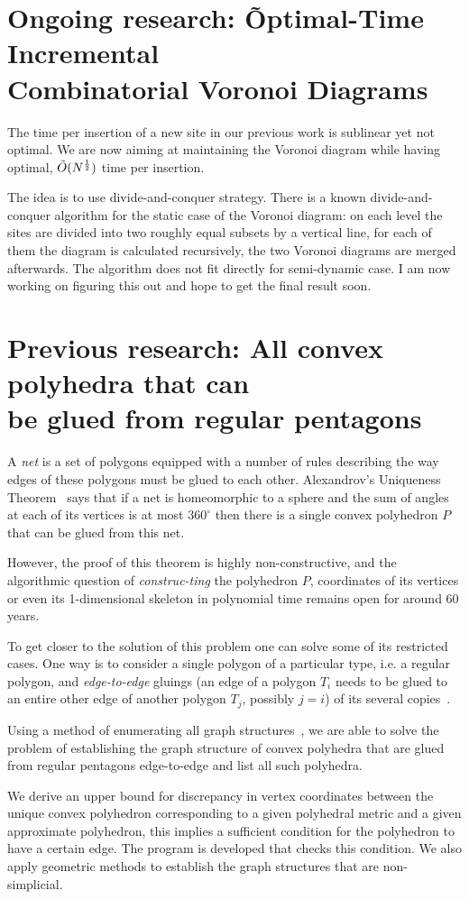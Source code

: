 \documentclass[a4paper,11pt]{article}
\def\vsection#1{\vspace{-4.5mm}\section{#1}\vspace{-3.5mm}}
\theoremstyle{definition}
\begin{document}
\vsection{Ongoing research: \~Optimal-Time Incremental \\
	Combinatorial Voronoi Diagrams}

The time per insertion of a new site in our previous work is sublinear yet not optimal. We are now aiming at maintaining the Voronoi diagram while having optimal, $\tilde O(N^{\frac12})$ time per insertion.

The idea is to use divide-and-conquer strategy. There is a known divide-and-conquer algorithm for the static case of the Voronoi diagram: on each level the sites are divided into two roughly equal subsets by a vertical line, for each of them the diagram is calculated recursively, the two Voronoi diagrams are merged afterwards. The algorithm does not fit directly for semi-dynamic case. I am now working on figuring this out and hope to get the final result soon.

\vsection{Previous research: All convex polyhedra that can\\
	be glued from regular pentagons}

	A \emph{net} is a set of polygons equipped with a number of rules describing the way edges of these polygons must be glued to each other. Alexandrov's Uniqueness Theorem~\cite{alex} says that if a net is homeomorphic to a sphere and the sum of angles at each of its vertices is at most $360^\circ$ then there is a single convex polyhedron $P$ that can be glued from this net.

However, the proof of this theorem is highly non-constructive, and the algorithmic question of {\it construc-\linebreak ting} the polyhedron $P$, coordinates of its vertices or even its 1-dimensional skeleton in polynomial time remains open for around 60 years.

To get closer to the solution of this problem one can solve some of its restricted cases. One way is to consider a single polygon of a particular type, i.e. a regular polygon, and {\it edge-to-edge} gluings (an edge of a polygon $T_i$ needs to be glued to an entire other edge of another polygon $T_j$, possibly $j=i$) of its several copies~\cite{gfalop}.

Using a method of enumerating all graph structures~\cite{kl17-hex}, we are able to solve the problem of establishing the graph structure of convex polyhedra that are glued from regular pentagons edge-to-edge and list all such polyhedra.

We derive an upper bound for discrepancy in vertex coordinates between the unique convex polyhedron corresponding to a given polyhedral metric and a given approximate polyhedron, this implies a sufficient condition for the polyhedron to have a certain edge. The program is developed that checks this condition. We also apply geometric methods to establish the graph structures that are non-simplicial.
\end{document}
